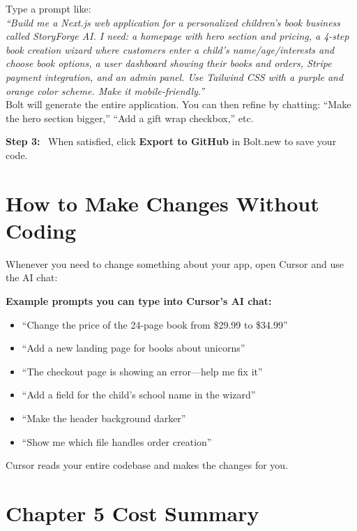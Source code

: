 \documentclass[12pt, letterpaper, oneside]{book}
\newcommand{\step}[1]{\noindent\textbf{\textcolor{primary}{Step #1:}}~}
\begin{document}
\begin{actionbox}
Type a prompt like:\\[4pt]
\textit{``Build me a Next.js web application for a personalized children's book business called StoryForge AI. I need: a homepage with hero section and pricing, a 4-step book creation wizard where customers enter a child's name/age/interests and choose book options, a user dashboard showing their books and orders, Stripe payment integration, and an admin panel. Use Tailwind CSS with a purple and orange color scheme. Make it mobile-friendly.''}\\[4pt]
Bolt will generate the entire application. You can then refine by chatting: ``Make the hero section bigger,'' ``Add a gift wrap checkbox,'' etc.
\end{actionbox}

\step{3} When satisfied, click \textbf{Export to GitHub} in Bolt.new to save your code.

\section{How to Make Changes Without Coding}

Whenever you need to change something about your app, open Cursor and use the AI chat:

\begin{infobox}
\textbf{Example prompts you can type into Cursor's AI chat:}
\begin{itemize}[leftmargin=1.5em, itemsep=4pt]
  \item ``Change the price of the 24-page book from \$29.99 to \$34.99''
  \item ``Add a new landing page for books about unicorns''
  \item ``The checkout page is showing an error---help me fix it''
  \item ``Add a field for the child's school name in the wizard''
  \item ``Make the header background darker''
  \item ``Show me which file handles order creation''
\end{itemize}
Cursor reads your entire codebase and makes the changes for you.
\end{infobox}

\section{Chapter 5 Cost Summary}
\end{document}
